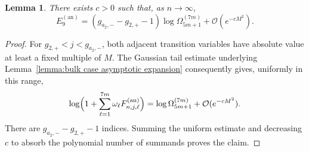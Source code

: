 \documentclass[a4paper]{article}
\newtheorem{lemma}[theorem]{Lemma}
\numberwithin{equation}{section}
\begin{document}
\begin{lemma}\label{lemma:asymptotic expansion E9 annulus}
There exists $c>0$ such that, as $n\to\infty$,
\[
  E_{9}^{(\mathrm{an})}
    =
    (g_{a_2,-}-g_{2,+}-1)\log \Omega_{5m+1}^{(7m)}+\mathcal{O}(e^{-cM^2}). 
\]

\end{lemma}

\begin{proof}
For $g_{2,+}<j<g_{a_2,-}$, both adjacent transition variables have absolute
value at least a fixed multiple of $M$.  The Gaussian tail estimate underlying
Lemma~\ref{lemma:bulk case asymptotic expansion} consequently gives, uniformly
in this range,
\[
\log\Bigl(1+\sum_{\ell=1}^{7m}\omega_\ell
F_{n,j,\ell}^{(\mathrm{an})}\Bigr)
=\log\Omega_{5m+1}^{(7m)}+\mathcal O(e^{-cM^2}).
\]
There are $g_{a_2,-}-g_{2,+}-1$ indices.  Summing the uniform estimate and
decreasing $c$ to absorb the polynomial number of summands proves the claim.
\end{proof}
\end{document}
